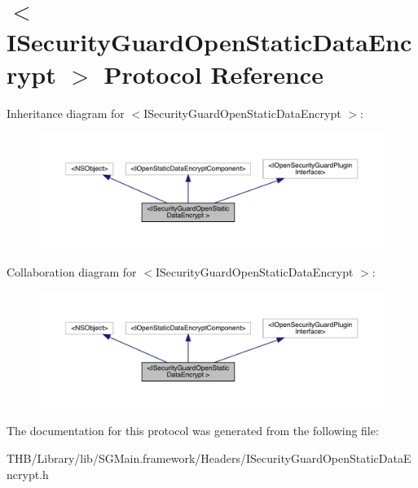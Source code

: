 \hypertarget{protocol_i_security_guard_open_static_data_encrypt_01-p}{}\section{$<$I\+Security\+Guard\+Open\+Static\+Data\+Encrypt $>$ Protocol Reference}
\label{protocol_i_security_guard_open_static_data_encrypt_01-p}


Inheritance diagram for $<$I\+Security\+Guard\+Open\+Static\+Data\+Encrypt $>$\+:\nopagebreak
\begin{figure}[H]
\begin{center}
\leavevmode
\includegraphics[width=350pt]{protocol_i_security_guard_open_static_data_encrypt_01-p__inherit__graph}
\end{center}
\end{figure}


Collaboration diagram for $<$I\+Security\+Guard\+Open\+Static\+Data\+Encrypt $>$\+:\nopagebreak
\begin{figure}[H]
\begin{center}
\leavevmode
\includegraphics[width=350pt]{protocol_i_security_guard_open_static_data_encrypt_01-p__coll__graph}
\end{center}
\end{figure}


The documentation for this protocol was generated from the following file\+:\begin{DoxyCompactItemize}
\item 
T\+H\+B/\+Library/lib/\+S\+G\+Main.\+framework/\+Headers/I\+Security\+Guard\+Open\+Static\+Data\+Encrypt.\+h\end{DoxyCompactItemize}
